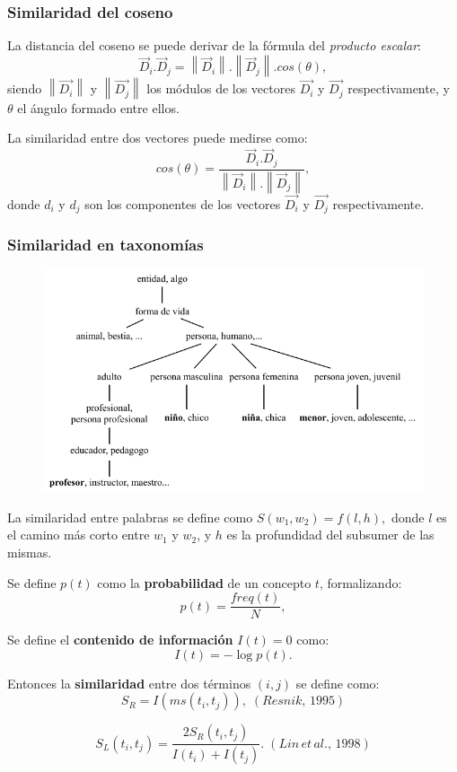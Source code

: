 \begin{frame}[allowframebreaks]
	\frametitle{Similaridad del coseno}
	La distancia del coseno se puede derivar de la fórmula del \textit{producto escalar}:
	\[\vec{D}_i.\vec{D}_j = \left \| \vec{D}_i \right \|.\left \| \vec{D}_j \right \|.cos(\theta),\]
	siendo \(\left \|\overrightarrow{D_i}\right \|\) y \(\left \|\overrightarrow{D_j}\right \|\) los módulos de los vectores \(\overrightarrow{D_i}\) y \(\overrightarrow{D_j}\) respectivamente, y $\theta$ el ángulo formado entre ellos.

	\bigskip

	La similaridad entre dos vectores puede medirse como:
	\[cos(\theta) = \frac{\vec{D}_i.\vec{D}_j}{\left \| \vec{D}_i \right \|.\left \| \vec{D}_j \right \|},\]
	donde \(d_i\) y \(d_j\) son los componentes de los vectores \(\overrightarrow{D_i}\) y \(\overrightarrow{D_j}\) respectivamente.
\end{frame}

\begin{frame}[allowframebreaks]
	\frametitle{Similaridad en taxonomías}
		\begin{figure}
		\centering
		\includegraphics[width=0.7\linewidth]{../7_marco_teorico/imagenes/taxonomia_semantica}
		\label{fig:taxonomiasemantica}
	\end{figure}

	\begin{footnotesize}
		La similaridad entre palabras se define como \(S(w_1,w_2)=f(l,h),\)
		donde \(l\) es el camino más corto entre \(w_1\) y \(w_2\), y \(h\) es la profundidad del subsumer de las mismas.
	\end{footnotesize}

	\framebreak

	Se define \(p(t)\) como la \textbf{probabilidad} de un concepto \(t\), formalizando:
	\[p(t)=\frac{freq(t)}{N},\]

	\bigskip

	Se define el \textbf{contenido de información} \(I(t) = 0\) como:
	\[I(t)=-\log p(t).\]

	Entonces la \textbf{similaridad} entre dos términos \((i, j)\) se define como:
	\[S_R = I(ms(t_i,t_j)),\; (Resnik,\,1995)\]

	\[S_L(t_i, t_j)=\frac{2S_R(t_i,t_j)}{I(t_i)+I(t_j)}.\; (Lin\,et\,al.,\,1998)\]
\end{frame}

